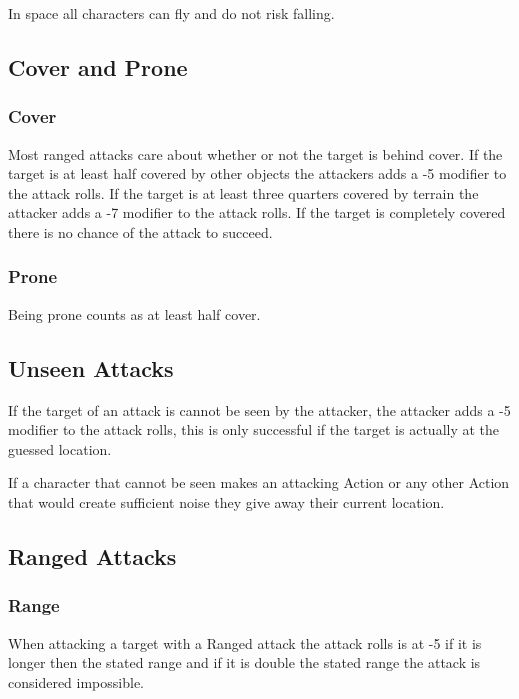 \documentclass[a4paper,12pt,oneside]{book}
\begin{document}
                In space all characters can fly and do not risk falling.

            \subsection{Cover and Prone}
                \subsubsection{Cover}
                Most ranged attacks care about whether or not the target is behind cover. If the target is at least half covered by other objects the attackers adds a -5 modifier to the attack rolls. If the target is at least three quarters covered by terrain the attacker adds a -7 modifier to the attack rolls. If the target is completely covered there is no chance of the attack to succeed.

                \subsubsection{Prone}
                Being prone counts as at least half cover.

            \subsection{Unseen Attacks}
                If the target of an attack is cannot be seen by the attacker, the attacker adds a -5 modifier to the attack rolls, this is only successful if the target is actually at the guessed location.

                If a character that cannot be seen makes an attacking Action or any other Action that would create sufficient noise they give away their current location.

            \subsection{Ranged Attacks}
                \subsubsection{Range}
                    When attacking a target with a Ranged attack the attack rolls is at -5 if it is longer then the stated range and if it is double the stated range the attack is considered impossible.
\end{document}
